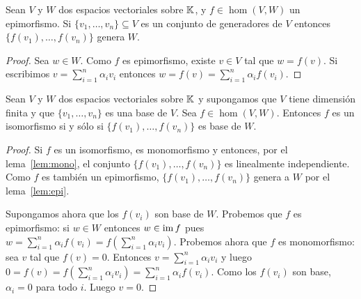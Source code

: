 \begin{lem}
	\label{lem:epi}
	Sean $V$ y $W$ dos espacios vectoriales sobre $\mathbb{K}$, y $f\in\hom(V,W)$ un
	epimorfismo.  Si 	$\{v_1,\dots,v_n\}\subseteq V$ es un conjunto 
	de generadores de $V$ entonces $\{f(v_1),\dots,f(v_n)\}$ genera $W$.

	\begin{proof}
		Sea $w\in W$. Como $f$ es epimorfismo, existe $v\in V$ tal que
		$w=f(v)$. Si escribimos
		$v=\sum_{i=1}^n\alpha_iv_i$ entonces 
		$w=f(v)=\sum_{i=1}^n\alpha_if(v_i)$. 
	\end{proof}
\end{lem}

\begin{prop}
	\label{pro:iso}
	Sean $V$ y $W$ dos espacios vectoriales sobre $\mathbb{K}$ y supongamos que $V$
	tiene dimensión finita y que $\{v_1,\dots,v_n\}$ es una base de $V$. Sea
	$f\in\hom(V,W)$.  Entonces $f$ es un isomorfismo si y sólo si
	$\{f(v_1),\dots,f(v_n)\}$ es base de $W$.

	\begin{proof}
		Si $f$ es un isomorfismo, es monomorfismo y entonces, por el
		lema~\ref{lem:mono}, el conjunto $\{f(v_1),\dots,f(v_n)\}$ es
		linealmente independiente. Como $f$ es también un epimorfismo,
		$\{f(v_1),\dots,f(v_n)\}$ genera a $W$ por el lema~\ref{lem:epi}.

		Supongamos ahora que los $f(v_i)$ son base de $W$.  Probemos que $f$ es
		epimorfismo: si $w\in W$ entonces $w\in\operatorname{im} f$ pues $w=\sum_{i=1}^n\alpha_if(v_i)=f(\sum_{i=1}^n \alpha_i
		v_i)$. Probemos ahora que $f$ es monomorfismo: sea $v$ tal que
		$f(v)=0$. Entonces $v=\sum_{i=1}^n\alpha_iv_i$ y luego
		$0=f(v)=f(\sum_{i=1}^n\alpha_iv_i)=\sum_{i=1}^n\alpha_if(v_i)$. Como los $f(v_i)$ son
		base, $\alpha_i=0$ para todo $i$. Luego $v=0$.
	\end{proof}
\end{prop}

